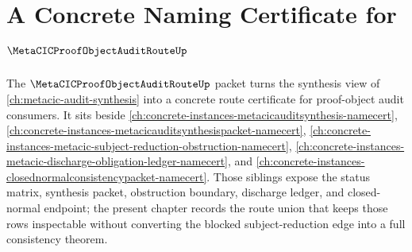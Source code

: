 \chapter{A Concrete Naming Certificate for $\MetaCICProofObjectAuditRouteUp$}
\label{ch:concrete-instances-metacic-proof-object-audit-route-namecert}

The $\MetaCICProofObjectAuditRouteUp$ packet turns the synthesis view of \autoref{ch:metacic-audit-synthesis} into a concrete route certificate for proof-object audit consumers. It sits beside \autoref{ch:concrete-instances-metacicauditsynthesis-namecert}, \autoref{ch:concrete-instances-metacicauditsynthesispacket-namecert}, \autoref{ch:concrete-instances-metacic-subject-reduction-obstruction-namecert}, \autoref{ch:concrete-instances-metacic-discharge-obligation-ledger-namecert}, and \autoref{ch:concrete-instances-closednormalconsistencypacket-namecert}. Those siblings expose the status matrix, synthesis packet, obstruction boundary, discharge ledger, and closed-normal endpoint; the present chapter records the route union that keeps those rows inspectable without converting the blocked subject-reduction edge into a full consistency theorem.

